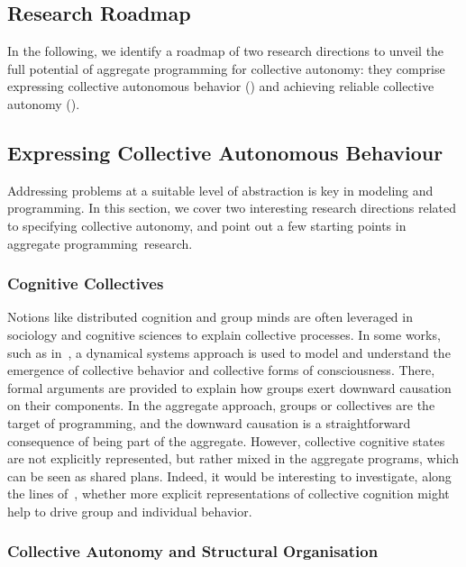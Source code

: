 \documentclass[jsan,article,accept,moreauthors,pdftex]{Definitions/mdpi}
\begin{document}
\begin{paracol}{2}
\section{Research Roadmap} %
\label{s:discussion}

In the following,
 we identify a roadmap of two research directions
 to unveil the full potential of aggregate programming for collective autonomy: they 
 comprise
 expressing collective autonomous behavior ()
 and
 achieving reliable collective autonomy
().

\subsection{Expressing Collective Autonomous Behaviour}
\label{gaps:expressiveness}

Addressing problems at a suitable level of abstraction
 is key in modeling and programming.
%
In this section, we cover two interesting research directions 
 related to specifying collective autonomy,
 and point out a few starting points in aggregate \mbox{programming research}.

\subsubsection{Cognitive Collectives}
%
Notions like distributed cognition 
 and group minds
 are often leveraged in sociology and cognitive sciences
 to explain collective processes.
%
In some works, such as in~\cite{DBLP:journals/mima/Palermos16},
 a dynamical systems approach is used
 to model and understand the emergence 
 of collective behavior and collective forms of consciousness.
%
There, formal arguments are provided to 
 explain how groups exert downward causation 
 on their components.
%
In the aggregate approach,
 groups or collectives
 are the target of programming,
 and the downward causation 
 is a straightforward consequence 
 of being part of the aggregate.
%
However, collective cognitive states are not explicitly represented,
 but rather mixed in the aggregate programs, which can be seen as shared plans.
%
Indeed, it would be interesting to investigate,
 along the lines of~\cite{viroli2017ijaose-aggregate-plans},
 whether more explicit representations 
 of collective cognition
 might help to drive group and individual behavior.


\subsubsection{Collective Autonomy and Structural Organisation}


\end{paracol}
\end{document}
